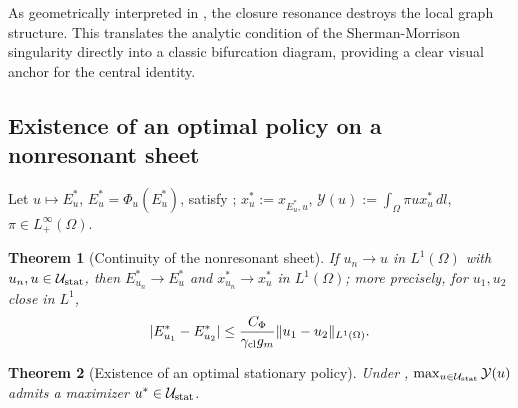 \documentclass[a4paper,fleqn,longmktitle]{cas-sc}
\theoremstyle{plain}
\newtheorem{theorem}{Theorem}[section]
\theoremstyle{definition}
\theoremstyle{remark}
\numberwithin{equation}{section}
\begin{document}
As geometrically interpreted in , the closure resonance destroys the local graph structure. This translates the analytic condition of the Sherman-Morrison singularity directly into a classic bifurcation diagram, providing a clear visual anchor for the central identity.

\subsection{Existence of an optimal policy on a nonresonant sheet}
\label{subsec:main_existence}
Let \(u\mapsto E_u^*\), \(E_u^*=\Phi_u(E_u^*)\), satisfy
; \(x_u^*:=x_{E_u^*,u}\),
\(\mathcal Y(u):=\int_\Omega\pi u x_u^*\,dl\), \(\pi\in L^\infty_+(\Omega)\).
\begin{theorem}[Continuity of the nonresonant sheet]
\label{thm:main_sheet_continuity}
If \(u_n\to u\) in \(L^1(\Omega)\) with \(u_n,u\in\mathcal U_{\rm stat}\), then
\(E_{u_n}^*\to E_u^*\) and \(x_{u_n}^*\to x_u^*\) in \(L^1(\Omega)\); more
precisely, for \(u_1,u_2\) close in \(L^1\),
\begin{equation}
    \label{eq:main_sheet_lipschitz}
    |E_{u_1}^*-E_{u_2}^*|
    \le
    \frac{C_\Phi}{\gamma_{\rm cl}g_m}
    \|u_1-u_2\|_{L^1(\Omega)}.
\end{equation}
\end{theorem}
\begin{theorem}[Existence of an optimal stationary policy]
\label{thm:main_existence_optimal_policy}
Under ,
\(\max_{u\in\mathcal U_{\rm stat}}\mathcal Y(u)\) admits a maximizer
\(u^*\in\mathcal U_{\rm stat}\).
\end{theorem}
\end{document}
